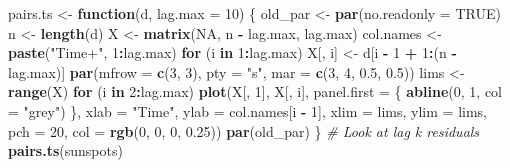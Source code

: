 \documentclass[]{book}
\newenvironment{Shaded}{\begin{snugshade}}{\end{snugshade}}
\newcommand{\CommentTok}[1]{\textcolor[rgb]{0.56,0.35,0.01}{\textit{#1}}}
\newcommand{\ControlFlowTok}[1]{\textcolor[rgb]{0.13,0.29,0.53}{\textbf{#1}}}
\newcommand{\DataTypeTok}[1]{\textcolor[rgb]{0.13,0.29,0.53}{#1}}
\newcommand{\DecValTok}[1]{\textcolor[rgb]{0.00,0.00,0.81}{#1}}
\newcommand{\FloatTok}[1]{\textcolor[rgb]{0.00,0.00,0.81}{#1}}
\newcommand{\KeywordTok}[1]{\textcolor[rgb]{0.13,0.29,0.53}{\textbf{#1}}}
\newcommand{\NormalTok}[1]{#1}
\newcommand{\OperatorTok}[1]{\textcolor[rgb]{0.81,0.36,0.00}{\textbf{#1}}}
\newcommand{\OtherTok}[1]{\textcolor[rgb]{0.56,0.35,0.01}{#1}}
\newcommand{\StringTok}[1]{\textcolor[rgb]{0.31,0.60,0.02}{#1}}
\begin{document}
\begin{Shaded}
\begin{Highlighting}[]
\NormalTok{pairs.ts <-}\StringTok{ }\ControlFlowTok{function}\NormalTok{(d, }\DataTypeTok{lag.max =} \DecValTok{10}\NormalTok{) \{}
\NormalTok{    old_par <-}\StringTok{ }\KeywordTok{par}\NormalTok{(}\DataTypeTok{no.readonly =} \OtherTok{TRUE}\NormalTok{)}
\NormalTok{    n <-}\StringTok{ }\KeywordTok{length}\NormalTok{(d)}
\NormalTok{    X <-}\StringTok{ }\KeywordTok{matrix}\NormalTok{(}\OtherTok{NA}\NormalTok{, n }\OperatorTok{-}\StringTok{ }\NormalTok{lag.max, lag.max)}
\NormalTok{    col.names <-}\StringTok{ }\KeywordTok{paste}\NormalTok{(}\StringTok{"Time+"}\NormalTok{, }\DecValTok{1}\OperatorTok{:}\NormalTok{lag.max)}
    \ControlFlowTok{for}\NormalTok{ (i }\ControlFlowTok{in} \DecValTok{1}\OperatorTok{:}\NormalTok{lag.max) X[, i] <-}\StringTok{ }\NormalTok{d[i }\OperatorTok{-}\StringTok{ }\DecValTok{1} \OperatorTok{+}\StringTok{ }\DecValTok{1}\OperatorTok{:}\NormalTok{(n }\OperatorTok{-}\StringTok{ }\NormalTok{lag.max)]}
    \KeywordTok{par}\NormalTok{(}\DataTypeTok{mfrow =} \KeywordTok{c}\NormalTok{(}\DecValTok{3}\NormalTok{, }\DecValTok{3}\NormalTok{), }\DataTypeTok{pty =} \StringTok{"s"}\NormalTok{, }\DataTypeTok{mar =} \KeywordTok{c}\NormalTok{(}\DecValTok{3}\NormalTok{, }\DecValTok{4}\NormalTok{, }\FloatTok{0.5}\NormalTok{, }\FloatTok{0.5}\NormalTok{))}
\NormalTok{    lims <-}\StringTok{ }\KeywordTok{range}\NormalTok{(X)}
    \ControlFlowTok{for}\NormalTok{ (i }\ControlFlowTok{in} \DecValTok{2}\OperatorTok{:}\NormalTok{lag.max) }\KeywordTok{plot}\NormalTok{(X[, }\DecValTok{1}\NormalTok{], X[, i], }\DataTypeTok{panel.first =}\NormalTok{ \{}
        \KeywordTok{abline}\NormalTok{(}\DecValTok{0}\NormalTok{, }\DecValTok{1}\NormalTok{, }\DataTypeTok{col =} \StringTok{"grey"}\NormalTok{)}
\NormalTok{    \}, }\DataTypeTok{xlab =} \StringTok{"Time"}\NormalTok{, }\DataTypeTok{ylab =}\NormalTok{ col.names[i }\OperatorTok{-}\StringTok{ }\DecValTok{1}\NormalTok{], }\DataTypeTok{xlim =}\NormalTok{ lims, }\DataTypeTok{ylim =}\NormalTok{ lims, }\DataTypeTok{pch =} \DecValTok{20}\NormalTok{, }
        \DataTypeTok{col =} \KeywordTok{rgb}\NormalTok{(}\DecValTok{0}\NormalTok{, }\DecValTok{0}\NormalTok{, }\DecValTok{0}\NormalTok{, }\FloatTok{0.25}\NormalTok{))}
    \KeywordTok{par}\NormalTok{(old_par)}
\NormalTok{\}}
\CommentTok{# Look at lag k residuals}
\KeywordTok{pairs.ts}\NormalTok{(sunspots)}
\end{Highlighting}
\end{Shaded}
\end{document}
